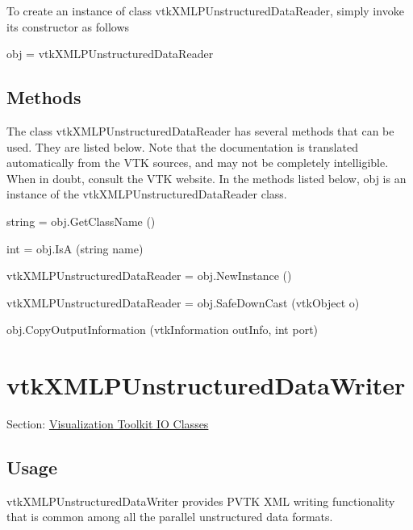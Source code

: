 To create an instance of class vtk\-X\-M\-L\-P\-Unstructured\-Data\-Reader, simply invoke its constructor as follows \begin{DoxyVerb}  obj = vtkXMLPUnstructuredDataReader
\end{DoxyVerb}
 \hypertarget{vtkwidgets_vtkxyplotwidget_Methods}{}\subsection{Methods}\label{vtkwidgets_vtkxyplotwidget_Methods}
The class vtk\-X\-M\-L\-P\-Unstructured\-Data\-Reader has several methods that can be used. They are listed below. Note that the documentation is translated automatically from the V\-T\-K sources, and may not be completely intelligible. When in doubt, consult the V\-T\-K website. In the methods listed below, {\ttfamily obj} is an instance of the vtk\-X\-M\-L\-P\-Unstructured\-Data\-Reader class. 
\begin{DoxyItemize}
\item {\ttfamily string = obj.\-Get\-Class\-Name ()}  
\item {\ttfamily int = obj.\-Is\-A (string name)}  
\item {\ttfamily vtk\-X\-M\-L\-P\-Unstructured\-Data\-Reader = obj.\-New\-Instance ()}  
\item {\ttfamily vtk\-X\-M\-L\-P\-Unstructured\-Data\-Reader = obj.\-Safe\-Down\-Cast (vtk\-Object o)}  
\item {\ttfamily obj.\-Copy\-Output\-Information (vtk\-Information out\-Info, int port)}  
\end{DoxyItemize}\hypertarget{vtkio_vtkxmlpunstructureddatawriter}{}\section{vtk\-X\-M\-L\-P\-Unstructured\-Data\-Writer}\label{vtkio_vtkxmlpunstructureddatawriter}
Section\-: \hyperlink{sec_vtkio}{Visualization Toolkit I\-O Classes} \hypertarget{vtkwidgets_vtkxyplotwidget_Usage}{}\subsection{Usage}\label{vtkwidgets_vtkxyplotwidget_Usage}
vtk\-X\-M\-L\-P\-Unstructured\-Data\-Writer provides P\-V\-T\-K X\-M\-L writing functionality that is common among all the parallel unstructured data formats.

